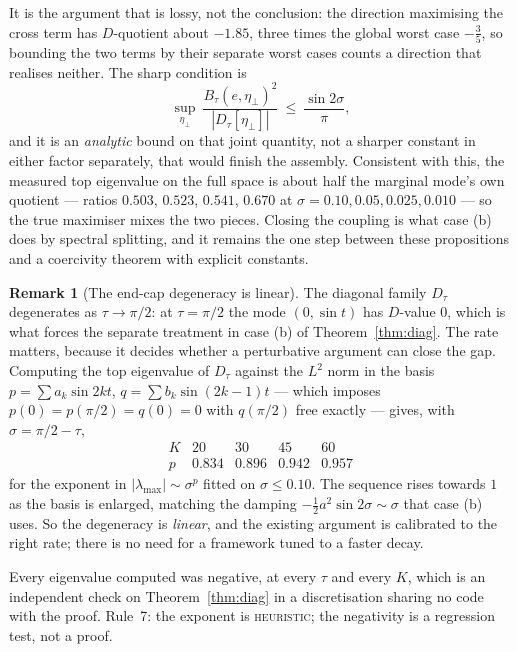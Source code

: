\documentclass[11pt]{article}
\theoremstyle{definition}
\newtheorem{remark}[theorem]{Remark}
\begin{document}
It is the argument that is lossy,
not the conclusion: the direction maximising the cross term has $D$-quotient about
$-1.85$, three times the global worst case $-\tfrac35$, so bounding the two terms by their
separate worst cases counts a direction that realises neither. The sharp condition is
\[
  \sup_{\eta_\perp}\ \frac{B_\tau(e,\eta_\perp)^2}{|D_\tau[\eta_\perp]|}\ \le\
  \frac{\sin2\sigma}{\pi} ,
\]
and it is an \emph{analytic} bound on that joint quantity, not a sharper constant in either
factor separately, that would finish the assembly. Consistent with this, the measured
top eigenvalue on the full space is about half the marginal mode's own quotient --- ratios
$0.503$, $0.523$, $0.541$, $0.670$ at $\sigma=0.10,0.05,0.025,0.010$ --- so the true
maximiser mixes the two pieces. Closing the coupling is what case (b) does by spectral
splitting, and it remains the one step between these propositions and a coercivity theorem
with explicit constants.

\begin{remark}[The end-cap degeneracy is linear]\label{rem:endcap}
The diagonal family $D_\tau$ degenerates as $\tau\to\pi/2$: at $\tau=\pi/2$ the mode
$(0,\sin t)$ has $D$-value $0$, which is what forces the separate treatment in case (b) of
Theorem~\ref{thm:diag}. The rate matters, because it decides whether a perturbative
argument can close the gap. Computing the top eigenvalue of $D_\tau$ against the $L^2$
norm in the basis $p=\sum a_k\sin 2kt$, $q=\sum b_k\sin(2k-1)t$ --- which imposes
$p(0)=p(\pi/2)=q(0)=0$ with $q(\pi/2)$ free exactly --- gives, with
$\sigma=\pi/2-\tau$,
\[
  \begin{array}{r|cccc}
    K & 20 & 30 & 45 & 60\\\hline
    p & 0.834 & 0.896 & 0.942 & 0.957
  \end{array}
\]
for the exponent in $|\lambda_{\max}|\sim\sigma^{p}$ fitted on $\sigma\le0.10$. The
sequence rises towards $1$ as the basis is enlarged, matching the damping
$-\tfrac12a^2\sin2\sigma\sim\sigma$ that case (b) uses. So the degeneracy is \emph{linear},
and the existing argument is calibrated to the right rate; there is no need for a framework
tuned to a faster decay.

Every eigenvalue computed was negative, at every $\tau$ and every $K$, which is an
independent check on Theorem~\ref{thm:diag} in a discretisation sharing no code with the
proof. Rule~7: the exponent is \textsc{heuristic}; the negativity is a regression test, not
a proof.
\end{remark}
\end{document}
